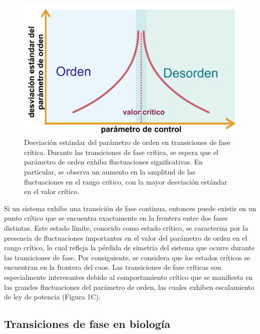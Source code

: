 \begin{figure}[h!]
	\centering\includegraphics[width=\imsize]{transiciones_fases_tipo_II_divergencia}
	\caption[Desviación estándar del parámetro de orden en transiciones de fase crítica.]{Desviación estándar del parámetro de orden en transiciones de fase crítica. Durante las transiciones de fase crítica, se espera que el parámetro de orden exhiba fluctuaciones significativas. En particular, se observa un aumento en la amplitud de las fluctuaciones en el rango crítico, con la mayor desviación estándar en el valor crítico.} 	\label{fig:divergencia}
\end{figure}


Si un sistema exhibe una transición de fase continua, entonces puede existir en un punto crítico que se encuentra exactamente en la frontera entre dos fases distintas. Este estado límite, conocido como estado crítico, se caracteriza por la presencia de fluctuaciones importantes en el valor del parámetro de orden en el rango crítico, lo cual refleja la pérdida de simetría del sistema que ocurre durante las transiciones de fase. Por consiguiente, se considera que los estados críticos se encuentran en la frontera del caos. Las transiciones de fase críticas son especialmente interesantes debido al comportamiento crítico que se manifiesta en las grandes fluctuaciones del parámetro de orden, las cuales exhiben escalamiento de ley de potencia (Figura 1C).



\subsection{Transiciones de fase en biología}


